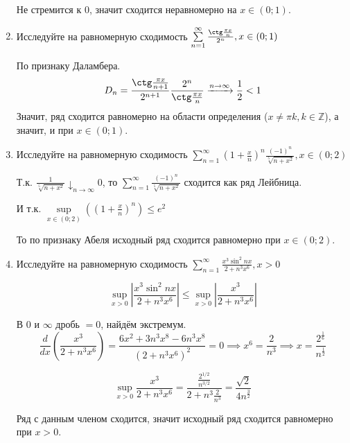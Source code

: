 \documentclass{article}
\begin{document}
\begin{large}
\begin{enumerate}
Не стремится к $0$, значит сходится неравномерно на $x \in (0;1)$.

\item Исследуйте на равномерную сходимость $ \sum\limits_{n=1}^{\infty} \frac{\ctg \frac{\pi x}{n}}{2^n}, x \in (0;1) $

По признаку Даламбера.
$$ D_n =  \frac{\ctg \frac{\pi x}{n+1}}{2^{n+1}} \frac{2^n}{\ctg \frac{\pi x}{n}} \xrightarrow{n\to\infty} \frac{1}{2} < 1 $$
Значит, ряд сходится равномерно на области определения ($x \neq \pi k, k \in \mathbb{Z}$), а значит, и при $x \in (0;1)$.

\item Исследуйте на равномерную сходимость $ \sum\limits_{n=1}^{\infty} \left( 1 + \frac{x}{n} \right)^n \frac{(-1)^n}{\sqrt[5]{n + x^2}}, x\in (0;2)  $

Т.к. $\frac{1}{\sqrt[5]{n + x^2}} \downarrow_{n\to\infty}0$, то $ \sum\limits_{n=1}^{\infty} \frac{(-1)^n}{\sqrt[5]{n + x^2}} $ сходится как ряд Лейбница.

И т.к. $ \sup\limits_{x\in(0;2)} \left( \left( 1 + \frac{x}{n} \right)^n \right) \leq e^2 $

То по признаку Абеля исходный ряд сходится равномерно при $x \in (0;2)$.

\item Исследуйте на равномерную сходимость $ \sum\limits_{n=1}^{\infty} \frac{x^3 \sin^2 nx}{2 + n^3x^6}, x > 0 $

$$ \sup_{x>0} \left| \frac{x^3 \sin^2 nx}{2 + n^3x^6} \right| \leq \sup_{x>0} \left| \frac{x^3}{2 + n^3x^6} \right| $$

В $0$ и $\infty$ дробь $= 0$, найдём экстремум.
$$ \frac{d}{dx} \left( \frac{x^3}{2 + n^3x^6} \right) = \frac{6x^2 + 3n^3x^8-6n^3x^8}{(2 + n^3x^6)^2} = 0 \implies x^6 = \frac{2}{n^3} \implies x = \frac{2^\frac{1}{6}}{n^\frac{1}{2}} $$

$$ \sup_{x>0} \frac{x^3}{2 + n^3x^6} = \frac{\frac{2^{1/2}}{n^{3/2}}}{2 + n^3 \frac{2}{n^3}} = \frac{\sqrt{2}}{4 n^\frac{3}{2}} $$

Ряд с данным членом сходится, значит исходный ряд сходится равномерно при $x > 0$.


\end{enumerate}
\end{large}
\end{document}
